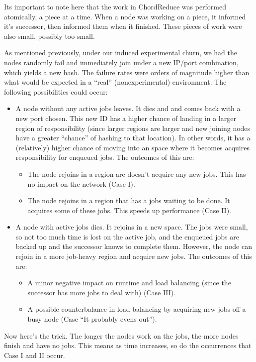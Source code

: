 Its important to note here that the work in ChordReduce was performed atomically, a piece at a time.
When a node was working on a piece, it informed it's successor, then informed them when it finished.
These pieces of work were also small, possibly too small.

As mentioned previously, under our induced experimental churn, we had the nodes randomly fail and immediately join under a new IP/port combination, which yields a new hash.
The failure rates were orders of magnitude higher than what would be expected in a ``real'' (nonexperimental) environment.
The following possibilities could occur:
\begin{itemize}
	\item A node without any active jobs leaves.
	It dies and and comes back with a new port chosen.
	This new ID has a higher chance of landing in a larger region of responsibility (since larger regions are larger and new joining nodes have a greater ``chance'' of hashing to that location).
	In other words, it has a (relatively) higher chance of moving into an space where it becomes acquires responsibility for enqueued jobs.
	The outcomes of this are:
	\begin{itemize}
		\item The node rejoins in a region are doesn't acquire any new jobs.
		This has no impact on the network (Case I).
		\item The node rejoins in a region that has a jobs waiting to be done.
		It acquires some of these jobs.
		This speeds up performance (Case II).
	\end{itemize}
	\item A node with active jobs dies.
	It rejoins in a new space.
	The jobs were small, so not too much time is lost on the active job, and the enqueued jobs are backed up and the successor knows to complete them.
	However, the node can rejoin in a more job-heavy region and acquire new jobs.
	The outcomes of this are:
	\begin{itemize}
		\item A minor negative impact on runtime and load balancing (since the successor has more jobs to deal with) (Case III).
		\item A possible counterbalance in load balancing by acquiring new jobs off a busy node (Case ``It probably evens out'').
	\end{itemize}
\end{itemize}

Now here's the trick.
The longer the nodes work on the jobs, the more nodes finish and have no jobs.
This means as time increases, so do the occurrences that Case I and II occur.


